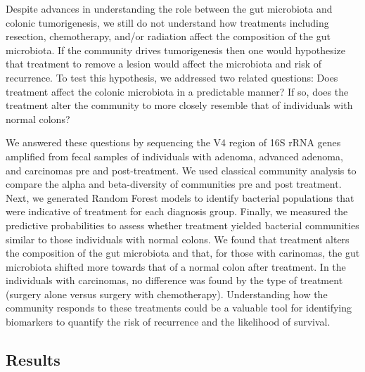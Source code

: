 \documentclass[12pt,]{article}
\begin{document}
Despite advances in understanding the role between the gut microbiota
and colonic tumorigenesis, we still do not understand how treatments
including resection, chemotherapy, and/or radiation affect the
composition of the gut microbiota. If the community drives tumorigenesis
then one would hypothesize that treatment to remove a lesion would
affect the microbiota and risk of recurrence. To test this hypothesis,
we addressed two related questions: Does treatment affect the colonic
microbiota in a predictable manner? If so, does the treatment alter the
community to more closely resemble that of individuals with normal
colons?

We answered these questions by sequencing the V4 region of 16S rRNA
genes amplified from fecal samples of individuals with adenoma, advanced
adenoma, and carcinomas pre and post-treatment. We used classical
community analysis to compare the alpha and beta-diversity of
communities pre and post treatment. Next, we generated Random Forest
models to identify bacterial populations that were indicative of
treatment for each diagnosis group. Finally, we measured the predictive
probabilities to assess whether treatment yielded bacterial communities
similar to those individuals with normal colons. We found that treatment
alters the composition of the gut microbiota and that, for those with
carinomas, the gut microbiota shifted more towards that of a normal
colon after treatment. In the individuals with carcinomas, no difference
was found by the type of treatment (surgery alone versus surgery with
chemotherapy). Understanding how the community responds to these
treatments could be a valuable tool for identifying biomarkers to
quantify the risk of recurrence and the likelihood of survival.

\newpage

\subsection{Results}\label{results}
\end{document}
